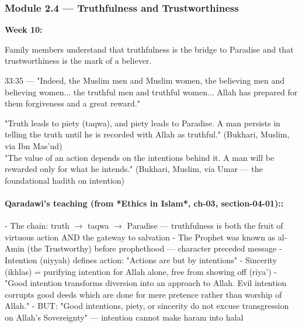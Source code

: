 \documentclass[11pt,a4paper]{article}
\begin{document}
\vspace{6pt}\noindent{\color{border}\rule{\textwidth}{0.5pt}}\vspace{6pt}

\subsubsection*{Module 2.4 --- Truthfulness and Trustworthiness}
\textbf{Week 10:} 

\begin{outcomebox} Family members understand that truthfulness is the bridge to Paradise and that trustworthiness is the mark of a believer. \end{outcomebox}

\begin{quranbox} 33:35 --- "Indeed, the Muslim men and Muslim women, the believing men and believing women... the truthful men and truthful women... Allah has prepared for them forgiveness and a great reward." \end{quranbox}

\begin{hadithbox} "Truth leads to piety (taqwa), and piety leads to Paradise. A man persists in telling the truth until he is recorded with Allah as truthful." (Bukhari, Muslim, via Ibn Mas'ud) \\ "The value of an action depends on the intentions behind it. A man will be rewarded only for what he intends." (Bukhari, Muslim, via Umar --- the foundational hadith on intention) \end{hadithbox}

\paragraph*{Qaradawi's teaching (from *Ethics in Islam*, ch-03, section-04-01)::}  - The chain: truth \ensuremath{\rightarrow} taqwa \ensuremath{\rightarrow} Paradise --- truthfulness is both the fruit of virtuous action AND the gateway to salvation - The Prophet was known as al-Amin (the Trustworthy) before prophethood --- character preceded message - Intention (niyyah) defines action: "Actions are but by intentions" - Sincerity (ikhlas) = purifying intention for Allah alone, free from showing off (riya') - "Good intention transforms diversion into an approach to Allah. Evil intention corrupts good deeds which are done for mere pretence rather than worship of Allah." - BUT: "Good intentions, piety, or sincerity do not excuse transgression on Allah's Sovereignty" --- intention cannot make haram into halal
\end{document}
